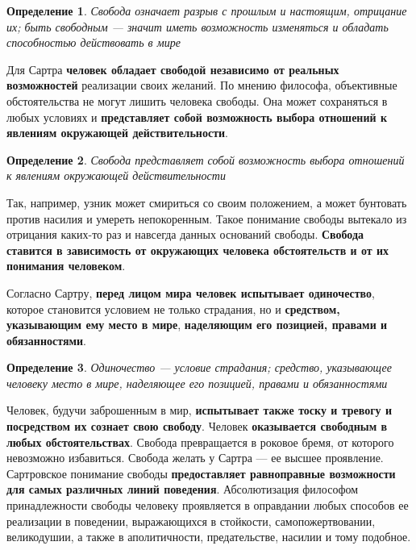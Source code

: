 \documentclass{article}
\newtheorem{definition}{Определение}
\begin{document}
\begin{flushleft}
\begin{definition}
    Свобода означает разрыв с прошлым и настоящим, отрицание их; быть свободным — значит иметь возможность изменяться и обладать способностью действовать в мире
\end{definition}

Для Сартра \textbf{человек обладает свободой независимо от реальных возможностей} реализации своих желаний. По мнению философа, объективные обстоятельства не могут лишить человека свободы. Она может сохраняться в любых условиях и \textbf{представляет собой возможность выбора отношений к явлениям окружающей действительности}.

\begin{definition}
    Свобода представляет собой возможность выбора отношений к явлениям окружающей действительности
\end{definition}

Так, например, узник может смириться со своим положением, а может бунтовать против насилия и умереть непокоренным. Такое понимание свободы вытекало из отрицания каких-то раз и навсегда данных оснований свободы. \textbf{Свобода ставится в зависимость от окружающих человека обстоятельств и от их понимания человеком}.

\hfill

Согласно Сартру, \textbf{перед лицом мира человек испытывает одиночество}, которое становится условием не только страдания, но и \textbf{средством, указывающим ему место в мире}, \textbf{наделяющим его позицией, правами и обязанностями}.

\begin{definition}
    Одиночество — условие страдания; средство, указывающее человеку место в мире, наделяющее его позицией, правами и обязанностями
\end{definition}

Человек, будучи заброшенным в мир, \textbf{испытывает также тоску и тревогу и посредством их сознает свою свободу}. Человек \textbf{оказывается свободным в любых обстоятельствах}. Свобода превращается в роковое бремя, от которого невозможно избавиться. Свобода желать у Сартра — ее высшее проявление. Сартровское понимание свободы \textbf{предоставляет равноправные возможности для самых различных линий поведения}. Абсолютизация философом принадлежности свободы человеку проявляется в оправдании любых способов ее реализации в поведении, выражающихся в стойкости, самопожертвовании, великодушии, а также в аполитичности, предательстве, насилии и тому подобное.


\end{flushleft}
\end{document}
